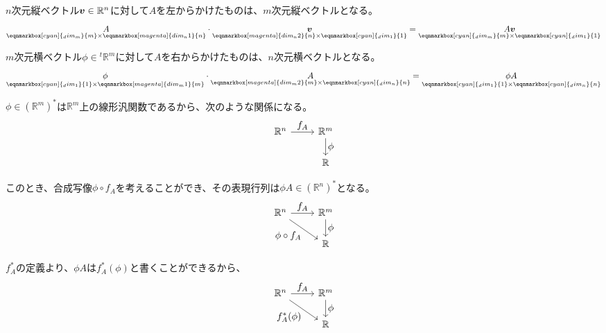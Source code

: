 \documentclass[../../../topic_linear-algebra]{subfiles}
\begin{document}
\begin{handout}[補足：ベクトルと行列の積の次元]
  $n$次元縦ベクトル$\vb*{v} \in \mathbb{R}^n$に対して$A$を左からかけたものは、$m$次元縦ベクトルとなる。
  \begin{equation*}
    \underset{\eqnmarkbox[cyan]{_dim_m}{m} \times \eqnmarkbox[magenta]{dim_n1}{n}}{A} \cdot \underset{\eqnmarkbox[magenta]{dim_n2}{n} \times \eqnmarkbox[cyan]{_dim_1}{1}}{\vb*{v}} = \underset{\eqnmarkbox[cyan]{_dim_m}{m} \times \eqnmarkbox[cyan]{_dim_1}{1}}{A \vb*{v}}
  \end{equation*}

  $m$次元横ベクトル$\phi \in {}^t\mathbb{R}^m$に対して$A$を右からかけたものは、$n$次元横ベクトルとなる。
  \begin{equation*}
    \underset{\eqnmarkbox[cyan]{_dim_1}{1} \times \eqnmarkbox[magenta]{dim_m1}{m}}{\phi} \cdot \underset{\eqnmarkbox[magenta]{dim_m2}{m} \times \eqnmarkbox[cyan]{_dim_n}{n}}{A} = \underset{\eqnmarkbox[cyan]{_dim_1}{1} \times \eqnmarkbox[cyan]{_dim_n}{n}}{\phi A}
  \end{equation*}
\end{handout}

\br

$\phi \in (\mathbb{R}^m)^*$は$\mathbb{R}^m$上の線形汎関数であるから、次のような関係になる。
\begin{equation*}
  \begin{tikzcd}[every label/.append style = {font = \normalsize}]
    \mathbb{R}^n \arrow[r,"f_A"] & \mathbb{R}^m \arrow[d,"\phi"]\\
    & \mathbb{R}
  \end{tikzcd}
\end{equation*}

このとき、合成写像$\phi \circ f_A$を考えることができ、その表現行列は$\phi A \in (\mathbb{R}^n)^*$となる。
\begin{equation*}
  \begin{tikzcd}[every label/.append style = {font = \normalsize}]
    \mathbb{R}^n \arrow[r,"f_A"]\arrow[rd, "\phi \circ f_A"'] & \mathbb{R}^m \arrow[d,"\phi"]\\
    & \mathbb{R}
  \end{tikzcd}
\end{equation*}

$f_{A}^*$の定義より、$\phi A$は$f_A^*(\phi)$と書くことができるから、
\begin{equation*}
  \begin{tikzcd}[every label/.append style = {font = \normalsize}]
    \mathbb{R}^n \arrow[r,"f_A"]\arrow[rd, "f_A^*(\phi)"'] & \mathbb{R}^m \arrow[d,"\phi"]\\
    & \mathbb{R}
  \end{tikzcd}
\end{equation*}
\end{document}
